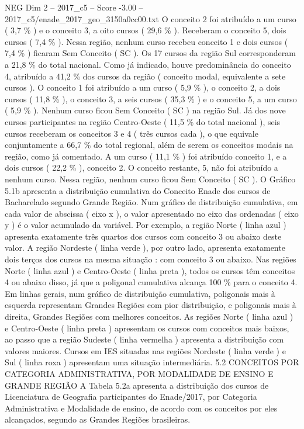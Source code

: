 \begin{textsample}{NEG Dim 2 – 2017\_c5 – Score -3.00 – 2017\_c5/enade\_2017\_geo\_3150a0cc00.txt}
O conceito 2 foi atribuído a um curso ( 3,7 \% ) e o conceito 3, a oito cursos ( 29,6 \% ).
Receberam o conceito 5, dois cursos ( 7,4 \% ).
Nessa região, nenhum curso recebeu conceito 1 e dois cursos ( 7,4 \% ) ficaram Sem Conceito ( SC ).
Os 17 cursos da região Sul corresponderam a 21,8 \% do total nacional.
Como já indicado, houve predominância do conceito 4, atribuído a 41,2 \% dos cursos da região ( conceito modal, equivalente a sete cursos ).
O conceito 1 foi atribuído a um curso ( 5,9 \% ), o conceito 2, a dois cursos ( 11,8 \% ), o conceito 3, a seis cursos ( 35,3 \% ) e o conceito 5, a um curso ( 5,9 \% ).
Nenhum curso ficou Sem Conceito ( SC ) na região Sul.
Já dos nove cursos participantes na região Centro-Oeste ( 11,5 \% do total nacional ), seis cursos receberam os conceitos 3 e 4 ( três cursos cada ), o que equivale conjuntamente a 66,7 \% do total regional, além de serem os conceitos modais na região, como já comentado.
A um curso ( 11,1 \% ) foi atribuído conceito 1, e a dois cursos ( 22,2 \% ), conceito 2.
O conceito restante, 5, não foi atribuído a nenhum curso.
Nessa região, nenhum curso ficou Sem Conceito ( SC ).
O Gráfico 5.1b apresenta a distribuição cumulativa do Conceito Enade dos cursos de Bacharelado segundo Grande Região.
Num gráfico de distribuição cumulativa, em cada valor de abscissa ( eixo x ), o valor apresentado no eixo das ordenadas ( eixo y ) é o valor acumulado da variável.
Por exemplo, a região Norte ( linha azul ) apresenta exatamente três quartos dos cursos com conceito 3 ou abaixo deste valor.
A região Nordeste ( linha verde ), por outro lado, apresenta exatamente dois terços dos cursos na mesma situação : com conceito 3 ou abaixo.
Nas regiões Norte ( linha azul ) e Centro-Oeste ( linha preta ), todos os cursos têm conceitos 4 ou abaixo disso, já que a poligonal cumulativa alcança 100 \% para o conceito 4.
Em linhas gerais, num gráfico de distribuição cumulativa, poligonais mais à esquerda representam Grandes Regiões com pior distribuição, e poligonais mais à direita, Grandes Regiões com melhores conceitos.
As regiões Norte ( linha azul ) e Centro-Oeste ( linha preta ) apresentam os cursos com conceitos mais baixos, ao passo que a região Sudeste ( linha vermelha ) apresenta a distribuição com valores maiores.
Cursos em IES situadas nas regiões Nordeste ( linha verde ) e Sul ( linha roxa ) apresentam uma situação intermediária. 5.2 CONCEITOS POR CATEGORIA ADMINISTRATIVA, POR MODALIDADE DE ENSINO E GRANDE REGIÃO A Tabela 5.2a apresenta a distribuição dos cursos de Licenciatura de Geografia participantes do Enade/2017, por Categoria Administrativa e Modalidade de ensino, de acordo com os conceitos por eles alcançados, segundo as Grandes Regiões brasileiras.

\end{textsample}

